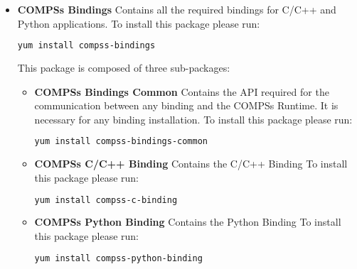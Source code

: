 \begin{itemize}
 \item \textbf{COMPSs Bindings} \newline
       Contains all the required bindings for C/C++ and Python applications.
       \newline
       To install this package please run:
       \begin{lstlisting}[language=bash]
	  yum install compss-bindings
       \end{lstlisting}
       This package is composed of three sub-packages:
       \begin{itemize}
        \item \textbf{COMPSs Bindings Common} \newline
	      Contains the API required for the communication between any binding and the COMPSs Runtime. It is necessary for any binding installation.
	      \newline
	      To install this package please run:
	      \begin{lstlisting}[language=bash]
		  yum install compss-bindings-common
	      \end{lstlisting}
        \item \textbf{COMPSs C/C++ Binding} \newline
	      Contains the C/C++ Binding
	      \newline
	      To install this package please run:
	      \begin{lstlisting}[language=bash]
		  yum install compss-c-binding
	      \end{lstlisting}
        \item \textbf{COMPSs Python Binding} \newline
	      Contains the Python Binding
	      \newline
	      To install this package please run:
	      \begin{lstlisting}[language=bash]
		  yum install compss-python-binding
	      \end{lstlisting}
       \end{itemize}


\end{itemize}
